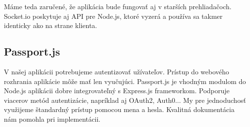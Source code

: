 Máme teda zaručené, že aplikácia bude fungovať aj v starších prehliadačoch. Socket.io
poskytuje aj API pre Node.js, ktoré vyzerá a používa sa takmer identicky ako na strane
klienta.~\cite{bib:raisocketio,bib:walshwebsocket}

\subsection{Passport.js}
\label{sec:nodejs:passportjs}

V našej aplikácii potrebujeme autentizovať užívateľov. Prístup do webového
rozhrania aplikácie môže mať len vyučujúci. Passport.js je vhodným modulom
do Node.js aplikácii dobre integrovateľný s Express.js frameworkom.
Podporuje viacerov metód autentizácie, napríklad aj OAuth2, Auth0...
My pre jednoduchosť využijeme štandardný prístup pomocou mena a hesla.
Kvalitná dokumentácia~\cite{bib:passportjsdocs} nám pomohla pri implementácii.